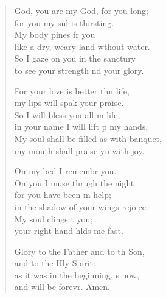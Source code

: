 \begin{verse}
  \begin{patverse}
     God, you are my God, for you  long;\Med\\
for you my sul is thirsting.\\
My body pines fr you\Med\\
like a dry, weary land wthout water.\\
So I gaze on you in the sanctury\Med\\
to see your strength nd your glory.

For your love is better thn life,\Med\\
my lips will spak your praise.\\
So I will bless you all m life,\Med\\
in your name I will lift p my hands.\\
My soul shall be filled as with  banquet,\Med\\
my mouth shall praise yu with joy.

On my bed I remembr you.\Med\\
On you I muse thrugh the night\\
for you have been m help;\Med\\
in the shadow of your wings  rejoice.\\
My soul clings t you;\Med\\
your right hand hlds me fast.

Glory to the Father and to th Son,\Med\\
and to the Hly Spirit:\\
as it was in the beginning, \pointup{\i}s now,\Med\\
and will be forevr. Amen.
  \end{patverse}
\end{verse}
